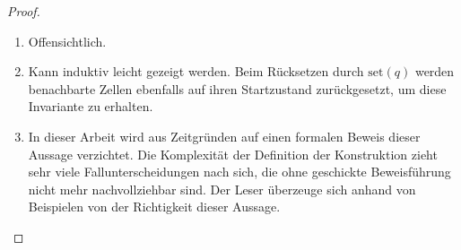 \begin{proof}
    \begin{enumerate}
        \item Offensichtlich.
        \item Kann induktiv leicht gezeigt werden.
            Beim Rücksetzen durch $\mathrm{set}(q)$ werden benachbarte Zellen ebenfalls auf ihren Startzustand zurückgesetzt, um diese Invariante zu erhalten.
        \item
            In dieser Arbeit wird aus Zeitgründen auf einen formalen Beweis dieser Aussage verzichtet.
            Die Komplexität der Definition der Konstruktion zieht sehr viele Fallunterscheidungen nach sich,
            die ohne geschickte Beweisführung nicht mehr nachvollziehbar sind.
            Der Leser überzeuge sich anhand von Beispielen von der Richtigkeit dieser Aussage.
    \end{enumerate}
\end{proof}

